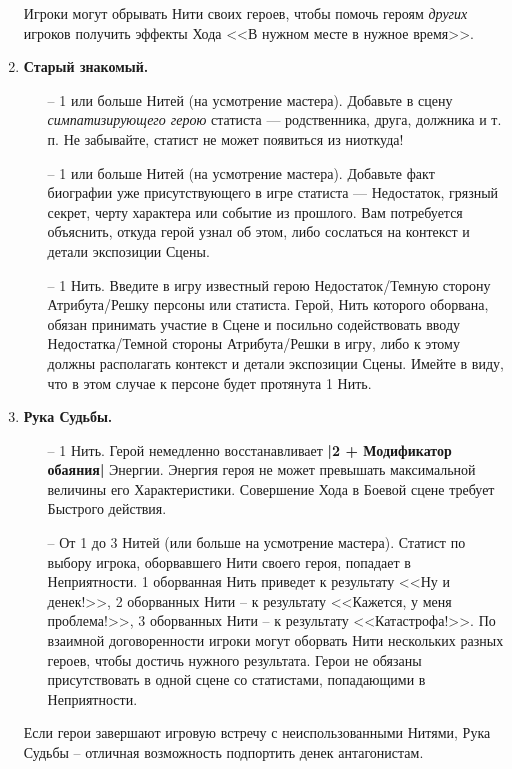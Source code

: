 \begin{enumerate}
\begin{itemize}
\end{itemize}
\begin{tcolorbox}
Игроки могут обрывать Нити своих героев, чтобы помочь героям \textit{других} игроков получить эффекты Хода <<В нужном месте в нужное время>>.
\end{tcolorbox}
\item \textbf{Старый знакомый.}
\begin{itemize}
\item[--] 1 или больше Нитей (на усмотрение мастера). Добавьте в сцену \textit{симпатизирующего герою} статиста — родственника, друга, должника и т. п. Не забывайте, статист не может появиться из ниоткуда!
\item[--] 1 или больше Нитей (на усмотрение мастера). Добавьте факт биографии уже присутствующего в игре статиста — Недостаток, грязный секрет, черту характера или событие из прошлого. Вам потребуется объяснить, откуда герой узнал об этом, либо сослаться на контекст и детали экспозиции Сцены.
\item[--] 1 Нить. Введите в игру известный герою Недостаток/Темную сторону Атрибута/Решку персоны или статиста. Герой, Нить которого оборвана, обязан принимать участие в Сцене и посильно содействовать вводу Недостатка/Темной стороны Атрибута/Решки в игру, либо к этому должны располагать контекст и детали экспозиции Сцены. Имейте в виду, что в этом случае к персоне будет протянута 1 Нить.
\end{itemize}
\item \textbf{Рука Судьбы.}
\begin{itemize}
\item[--] 1 Нить. Герой немедленно восстанавливает \textbf{|2 + Модификатор обаяния|} Энергии. Энергия героя не может превышать максимальной величины его Характеристики. Совершение Хода в Боевой сцене требует Быстрого действия.
\item[--] От 1 до 3 Нитей (или больше на усмотрение мастера). Статист по выбору игрока, оборвавшего Нити своего героя, попадает в Неприятности. 1 оборванная Нить приведет к результату <<Ну и денек!>>, 2 оборванных Нити – к результату <<Кажется, у меня проблема!>>, 3 оборванных Нити – к результату <<Катастрофа!>>. По взаимной договоренности игроки могут оборвать Нити нескольких разных героев, чтобы достичь нужного результата. Герои не обязаны присутствовать в одной сцене со статистами, попадающими в Неприятности.
\end{itemize}
\begin{tcolorbox}
Если герои завершают игровую встречу с неиспользованными Нитями, Рука Судьбы – отличная возможность подпортить денек антагонистам.

\end{tcolorbox}
\end{enumerate}
